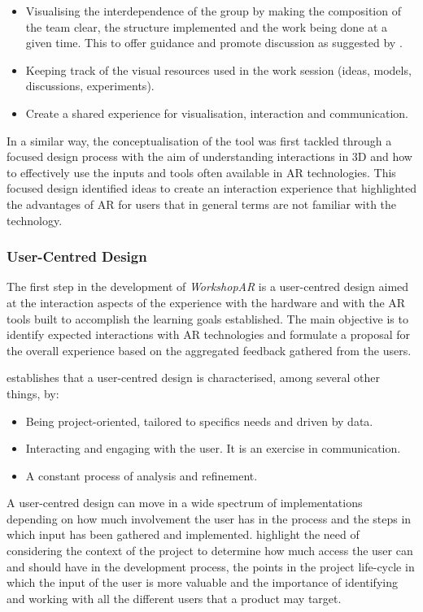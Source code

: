 \begin{itemize}
    \item Visualising the interdependence of the group by making the composition of the team clear, the structure implemented and the work being done at a given time. This
    to offer guidance and promote discussion as suggested by \textcite{salas_2015}.
    \item Keeping track of the visual resources used in the work session (ideas, models, discussions, experiments).
    \item Create a shared experience for visualisation, interaction and communication.
\end{itemize}

In a similar way, the conceptualisation of the tool was first tackled through a focused design process with the aim of understanding interactions in 3D and how to
effectively use the inputs and tools often available in AR technologies. This focused design identified ideas to create an interaction experience that highlighted the
advantages of \ac{AR} for users that in general terms are not familiar with the technology.

\subsubsection{User-Centred Design \label{sec:3-3-2-1}}

The first step in the development of \emph{WorkshopAR} is a user-centred design aimed at the interaction aspects of the experience with the hardware and with the \ac{AR} tools
built to accomplish the learning goals established. The main objective is to identify expected interactions with \ac{AR} technologies and formulate a proposal for the
overall experience based on the aggregated feedback gathered from the users.

\textcite{chammas_2015} establishes that a user-centred design is characterised, among several other things, by:

\begin{itemize}
    \item Being project-oriented, tailored to specifics needs and driven by data.
    \item Interacting and engaging with the user. It is an exercise in communication.
    \item A constant process of analysis and refinement.
\end{itemize}

A user-centred design can move in a wide spectrum of implementations depending on how much involvement the user has in the process and the steps in which input has been
gathered and implemented. \textcite{marti_2009} highlight the need of considering the context of the project to determine how much access the user can and should have in
the development process, the points in the project life-cycle in which the input of the user is more valuable and the importance of identifying and working with all the
different users that a product may target.

